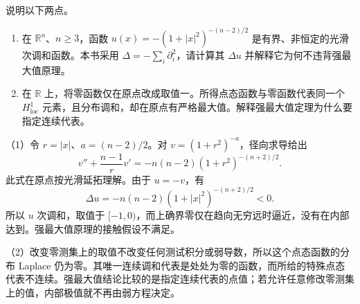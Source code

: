 \begin{exercise}\label{g3:ex:weak-subharmonic-limit-hypotheses}
	说明以下两点。
	\begin{enumerate}
		\item 在 \(\mathbb R^n\)、\(n\ge3\)，函数 \(u(x)=-(1+|x|^2)^{-(n-2)/2}\) 是有界、非恒定的光滑次调和函数。本书采用 \(\Delta=-\sum_i\partial_i^2\)，请计算其 \(\Delta u\) 并解释它为何不违背强最大值原理。
		\item 在 \(\mathbb R\) 上，将零函数仅在原点改成取值一。所得点态函数与零函数代表同一个 \(H^1_{\mathrm{loc}}\) 元素，且分布调和，却在原点有严格最大值。解释强最大值定理为什么要指定连续代表。
	\end{enumerate}
\end{exercise}
\begin{solution}
	（1）令 \(r=|x|\)、\(a=(n-2)/2\)。对 \(v=(1+r^2)^{-a}\)，径向求导给出
	\[
		v''+\frac{n-1}{r}v'
		=-n(n-2)(1+r^2)^{-(n+2)/2}.
	\]
	此式在原点按光滑延拓理解。由于 \(u=-v\)，有
	\[
		\Delta u=-n(n-2)(1+|x|^2)^{-(n+2)/2}<0.
	\]
	所以 \(u\) 次调和，取值于 \([-1,0)\)，而上确界零仅在趋向无穷远时逼近，没有在内部达到。强最大值原理的接触假设不满足。

	（2）改变零测集上的取值不改变任何测试积分或弱导数，所以这个点态函数的分布 Laplace 仍为零。其唯一连续调和代表是处处为零的函数，而所给的特殊点态代表不连续。强最大值结论比较的是指定连续代表的点值；若允许任意修改零测集上的值，内部极值就不再由弱方程决定。
\end{solution}

